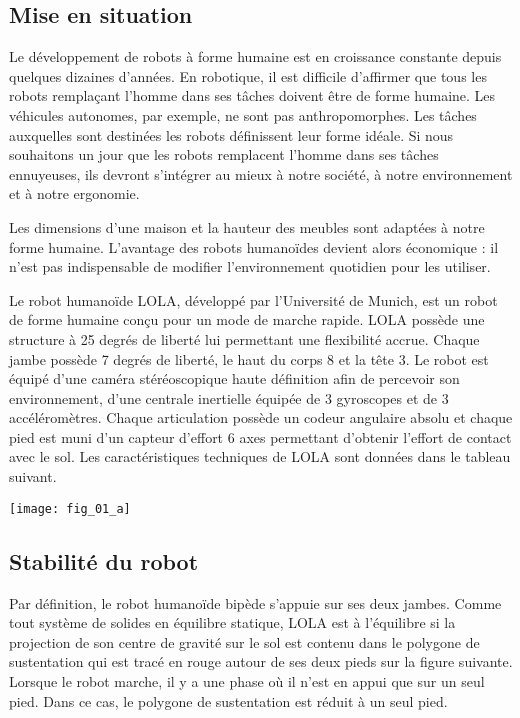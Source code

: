 \ifprof
\else
\begin{multicols}{2}
\fi

\subsection*{Mise en situation}

\ifprof
\else
Le développement de robots à forme humaine est en
croissance constante depuis quelques dizaines
d’années. En robotique, il est difficile d’affirmer que
tous les robots remplaçant l’homme dans ses tâches
doivent être de forme humaine. Les véhicules
autonomes, par exemple, ne sont pas
anthropomorphes. Les tâches auxquelles sont
destinées les robots définissent leur forme idéale. Si
nous souhaitons un jour que les robots remplacent
l’homme dans ses tâches ennuyeuses, ils devront
s’intégrer au mieux à notre société, à notre
environnement et à notre ergonomie.

Les dimensions d’une maison et la hauteur des meubles sont adaptées à notre forme humaine. L’avantage
des robots humanoïdes devient alors économique : il n’est pas indispensable de modifier l’environnement
quotidien pour les utiliser.

Le robot humanoïde LOLA, développé par l’Université de Munich, est un robot de forme humaine
conçu pour un mode de marche rapide. LOLA possède une structure à 25 degrés de liberté lui permettant une
flexibilité accrue. Chaque jambe possède 7 degrés de liberté, le haut du corps 8 et la tête 3.
Le robot est équipé d’une caméra stéréoscopique haute définition afin de percevoir son environnement, d’une
centrale inertielle équipée de 3 gyroscopes et de 3 accéléromètres. Chaque articulation possède un codeur
angulaire absolu et chaque pied est muni d’un capteur d’effort 6 axes permettant d’obtenir l’effort de contact
avec le sol. Les caractéristiques techniques de LOLA sont données dans le tableau suivant.


\begin{center}
\texttt{[image: fig\_01\_a]}
\end{center}
\fi

\subsection*{Stabilité du robot}
\ifprof
\else

Par définition, le robot humanoïde bipède s'appuie sur ses deux jambes.
Comme tout système de solides en équilibre statique, LOLA est à l’équilibre si
la projection de son centre de gravité sur le sol est contenu dans le polygone
de sustentation qui est tracé en rouge autour de ses deux pieds sur la figure suivante.
Lorsque le robot marche, il y a une phase où il n'est en appui que sur un seul
pied. Dans ce cas, le polygone de sustentation est réduit à un seul pied.



\end{multicols}

